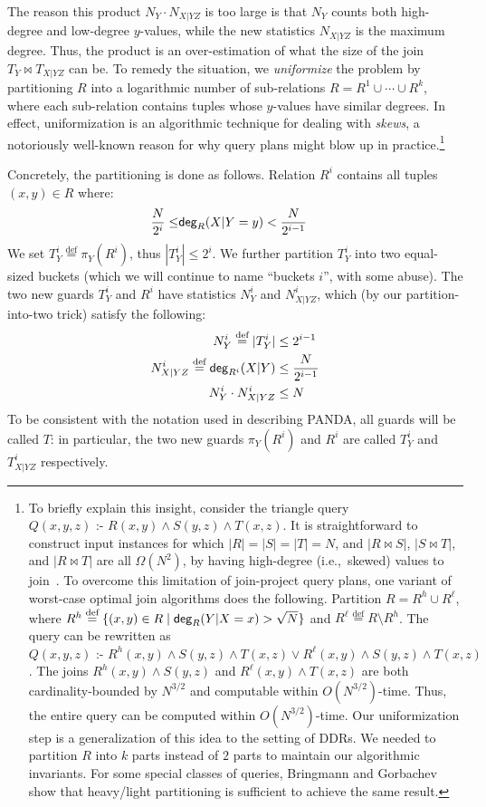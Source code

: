 \documentclass{theoretics}
\newcommand{\set}[1]{\{#1\}}                    %
\newcommand{\degree}{\text{\sf deg}}
\newcommand{\defeq}{\stackrel{\text{def}}{=}}
\newcommand{\cd}{\text{ :- }}
\newcommand{\panda}{\textsf{PANDA}\xspace}
\begin{document}
The reason this product $N_Y\cdot N_{X|YZ}$ is too large is that $N_Y$ counts both
high-degree and low-degree $y$-values, while the new statistics $N_{X|YZ}$ is the maximum
degree. Thus, the product is an over-estimation of what the size of the join $T_Y \Join
T_{X|YZ}$ can be. To remedy the situation, we {\em uniformize} the problem by partitioning
$R$ into a logarithmic number of sub-relations $R = R^1 \cup \cdots \cup R^k$, where each
sub-relation contains tuples whose $y$-values have similar degrees. In effect,
uniformization is an algorithmic technique for dealing with {\em skews}, a notoriously
well-known reason for why query plans might blow up in practice.\footnote{To
briefly explain  this insight, consider the triangle query $Q(x,y,z) \cd R(x,y) \wedge
S(y,z) \wedge T(x,z)$. It is straightforward to construct input instances for which $|R|=|S|=|T|=N$,
and $|R \Join S|$, $|S \Join T|$, and $|R \Join T|$ are all $\Omega(N^2)$, by having high-degree
(i.e.,~skewed) values to join~\cite{DBLP:journals/jacm/NgoPRR18}.
To overcome this limitation of join-project query plans, one variant of worst-case optimal
join algorithms does the following. Partition $R = R^h \cup R^\ell$, where
$R^h \defeq \set{(x,y) \in R \mid \degree_R(Y|X=x) > \sqrt N}$ and
$R^\ell \defeq R \setminus R^h$.\newline
%
The query can be rewritten as $Q(x,y,z) \cd R^h(x,y) \wedge S(y,z) \wedge T(x,z) \vee
R^\ell(x,y) \wedge S(y,z) \wedge T(x,z)$. The joins $R^h(x,y) \wedge S(y,z)$ and $R^\ell(x,
y) \wedge T(x, z)$ are both cardinality-bounded by $N^{3/2}$ and computable within
$O(N^{3/2})$-time. Thus, the entire query can be computed within $O(N^{3/2})$-time.\newline
%
Our uniformization step is a generalization of this idea to the setting of DDRs. We needed
to partition $R$ into $k$ parts instead of $2$ parts to maintain our algorithmic invariants.
For some special classes of queries, Bringmann and
Gorbachev~\cite{bringmann2024} show that
heavy/light partitioning is sufficient to achieve the same result.}


Concretely, the partitioning is done as follows.
Relation $R^i$ contains all tuples $(x,y)\in R$ where:
%
\begin{align*}
  \frac{N}{2^i}\leq & \degree_{R}(X|Y=y) < \frac{N}{2^{i-1}}
\end{align*}
%
We set $T^i_Y \defeq \pi_Y(R^i)$, thus $|T_Y^i| \leq 2^i$.  We further
partition $T_Y^i$ into two equal-sized buckets (which we will continue
to name ``buckets $i$'', with some abuse).  The two new guards $T_Y^i$ and $R^i$ have
statistics $N^i_Y$ and $N^i_{X|YZ}$, which (by our partition-into-two
trick) satisfy the following:
\begin{align*}
    N^i_Y \defeq |T_Y^i| & \leq 2^{i-1} \\
    N^i_{X|YZ} \defeq\degree_{R^i}(X|Y) &\leq \frac{N}{2^{i-1}} \\
   N^i_Y \cdot N^i_{X|YZ} & \leq N
\end{align*}
To be consistent with the notation used in describing \panda,
all guards will be called $T$: in particular, the two new guards  $\pi_Y(R^i)$ and $R^i$ are called $T^i_Y$ and
$T^i_{X|YZ}$ respectively.
\end{document}

